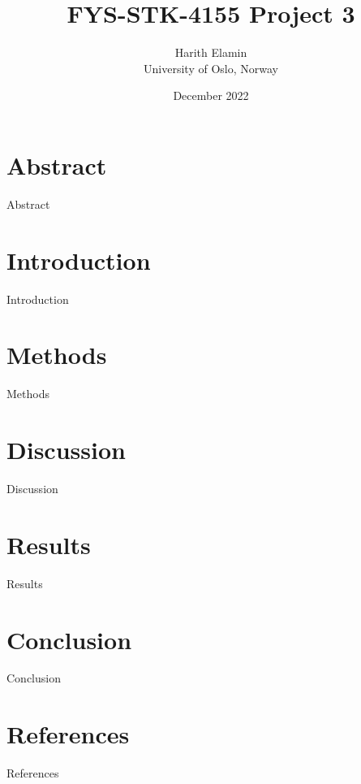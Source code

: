 \documentclass{article}
\title{FYS-STK-4155 Project 3}
\author{ Harith Elamin \\ University of Oslo, Norway}
\date{December 2022}
\begin{document}
\maketitle

\begin{multicols}{2}
\section{Abstract}
{Abstract}
\section{Introduction}
{Introduction}
\section{Methods}
{Methods}
\section{Discussion}
{Discussion}
\section{Results}
{Results}
\section{Conclusion}
{Conclusion}
\section{References}
{References}








\end{multicols}
\end{document}
